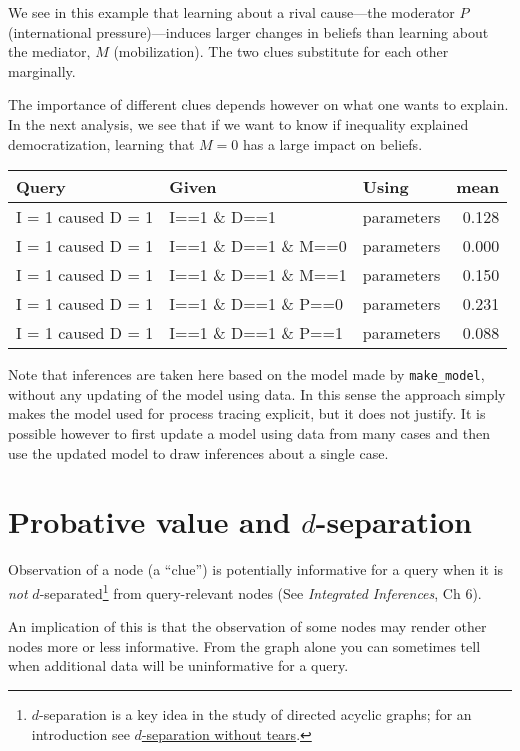\documentclass[
  12pt,
]{book}
\begin{document}
We see in this example that learning about a rival cause---the moderator \(P\) (international pressure)---induces larger changes in beliefs than learning about the mediator, \(M\) (mobilization). The two clues substitute for each other marginally.

The importance of different clues depends however on what one wants to explain. In the next analysis, we see that if we want to know if inequality explained democratization, learning that \(M=0\) has a large impact on beliefs.

\begin{tabular}{l|l|l|r}
\hline
Query & Given & Using & mean\\
\hline
I = 1 caused D = 1 & I==1 \& D==1 & parameters & 0.128\\
\hline
I = 1 caused D = 1 & I==1 \& D==1 \& M==0 & parameters & 0.000\\
\hline
I = 1 caused D = 1 & I==1 \& D==1 \& M==1 & parameters & 0.150\\
\hline
I = 1 caused D = 1 & I==1 \& D==1 \& P==0 & parameters & 0.231\\
\hline
I = 1 caused D = 1 & I==1 \& D==1 \& P==1 & parameters & 0.088\\
\hline
\end{tabular}

Note that inferences are taken here based on the model made by \texttt{make\_model}, without any updating of the model using data. In this sense the approach simply makes the model used for process tracing explicit, but it does not justify. It is possible however to first update a model using data from many cases and then use the updated model to draw inferences about a single case.

\hypertarget{probative-value-and-d-separation}{%
\section{\texorpdfstring{Probative value and \(d\)-separation}{Probative value and d-separation}}\label{probative-value-and-d-separation}}

Observation of a node (a ``clue'') is potentially informative for a query when it is \emph{not} \(d\)-separated\footnote{\(d\)-separation is a key idea in the study of directed acyclic graphs; for an introduction see \href{http://www.dagitty.net/learn/dsep/index\%3C-.html}{\(d\)-separation without tears}.} from query-relevant nodes (See \emph{Integrated Inferences}, Ch 6).

An implication of this is that the observation of some nodes may render other nodes more or less informative. From the graph alone you can sometimes tell when additional data will be uninformative for a query.
\end{document}
